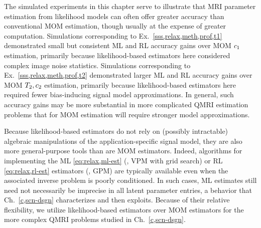 The simulated experiments in this chapter
serve to illustrate
that MRI parameter estimation
from likelihood models  
can often offer greater accuracy
than conventional MOM estimation,
though usually at the expense 
of greater computation.
Simulations corresponding to Ex.~\ref{sss,relax,meth,prof,t1}
demonstrated small but consistent ML and RL accuracy gains 
over MOM $c_{1}$ estimation,
primarily because likelihood-based estimators 
here considered complex image noise statistics.
Simulations corresponding to Ex.~\ref{sss,relax,meth,prof,t2}
demonstrated larger ML and RL accuracy gains
over MOM $T_2,c_{2}$ estimation,
primarily because likelihood-based estimators
here required fewer bias-inducing signal model approximations.
In general,
such accuracy gains
may be more substantial
in more complicated QMRI estimation problems
that for MOM estimation 
will require stronger model approximations.

Because likelihood-based estimators do not rely 
on (possibly intractable) algebraic manipulations 
of the application-specific signal model,
they are also more general-purpose tools 
than are MOM estimators.
Indeed, 
algorithms for implementing the ML \eqref{eq:relax,ml-est}
(\ie, VPM with grid search)
or RL \eqref{eq:relax,rl-est} estimators
(\ie, GPM)
are typically available
even when the associated inverse problem
is poorly conditioned.
In such cases,
ML estimates still need not necessarily be imprecise
in all latent parameter entries,
a behavior that Ch.~\ref{c,scn-dsgn}
characterizes and then exploits.
Because of their relative flexibility,
we utilize likelihood-based estimators
over MOM estimators
for the more complex QMRI problems
studied in Ch.~\ref{c,scn-dsgn}.

